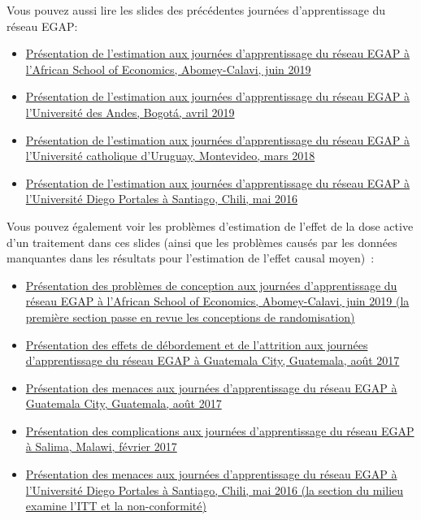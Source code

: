 \documentclass[
  12pt,
]{book}
\begin{document}
Vous pouvez aussi lire les slides des précédentes journées d'apprentissage du réseau EGAP:

\begin{itemize}
\item
  \href{https://egap.github.io/learningdays-resources/Slides/Examples/estimation-benin.pdf}{Présentation de l'estimation aux journées d'apprentissage du réseau EGAP à l'African School of Economics, Abomey-Calavi, juin 2019}
\item
  \href{https://egap.github.io/learningdays-resources/Slides/Examples/estimation-bogota.pdf}{Présentation de l'estimation aux journées d'apprentissage du réseau EGAP à l'Université des Andes, Bogotá, avril 2019}
\item
  \href{https://egap.github.io/learningdays-resources/Slides/Examples/estimation-montevideo.pdf}{Présentation de l'estimation aux journées d'apprentissage du réseau EGAP à l'Université catholique d'Uruguay, Montevideo, mars 2018}
\item
  \href{https://egap.github.io/learningdays-resources/Slides/Examples/estimation-santiago.pdf}{Présentation de l'estimation aux journées d'apprentissage du réseau EGAP à l'Université Diego Portales à Santiago, Chili, mai 2016}
\end{itemize}

Vous pouvez également voir les problèmes d'estimation de l'effet de la dose active d'un traitement dans ces slides (ainsi que les problèmes causés par les données manquantes dans les résultats pour l'estimation de l'effet causal moyen)~:

\begin{itemize}
\item
  \href{https://egap.github.io/learningdays-resources/Slides/Examples/threats-benin.pdf}{Présentation des problèmes de conception aux journées d'apprentissage du réseau EGAP à l'African School of Economics, Abomey-Calavi, juin 2019 (la première section passe en revue les conceptions de randomisation)}
\item
  \href{https://egap.github.io/learningdays-resources/Slides/Examples/spillovers_attrition-guatemala.pdf}{Présentation des effets de débordement et de l'attrition aux journées d'apprentissage du réseau EGAP à Guatemala City, Guatemala, août 2017}
\item
  \href{https://egap.github.io/learningdays-resources/Slides/Examples/threats-guatemala.pdf}{Présentation des menaces aux journées d'apprentissage du réseau EGAP à Guatemala City, Guatemala, août 2017}
\item
  \href{https://egap.github.io/learningdays-resources/Slides/Examples/complications-malawi.pdf}{Présentation des complications aux journées d'apprentissage du réseau EGAP à Salima, Malawi, février 2017}
\item
  \href{https://egap.github.io/learningdays-resources/Slides/Examples/threats-santiago.pdf}{Présentation des menaces aux journées d'apprentissage du réseau EGAP à l'Université Diego Portales à Santiago, Chili, mai 2016 (la section du milieu examine l'ITT et la non-conformité)}
\end{itemize}
\end{document}
